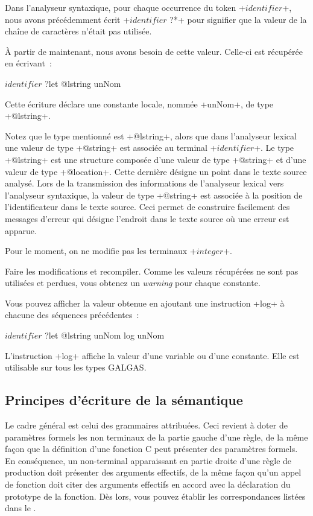 Dans l’analyseur syntaxique, pour chaque occurrence du token \ggst+$identifier$+, nous avons précédemment écrit \ggst+$identifier$ ?*+ pour signifier que la valeur de la chaîne de caractères n’était pas utilisée.

À partir de maintenant, nous avons besoin de cette valeur. Celle-ci est récupérée en écrivant~:

\begin{galgas3}
$identifier$ ?let @lstring unNom
\end{galgas3}


Cette écriture déclare une constante locale, nommée \ggst+unNom+, de type \ggst+@lstring+.

Notez que le type mentionné est \ggst+@lstring+, alors que dans l’analyseur lexical une valeur de type \ggst+@string+ est associée au terminal \ggst+$identifier$+. Le type \ggst+@lstring+ est une structure composée d’une valeur de type \ggst+@string+ et d’une valeur de type \ggst+@location+. Cette dernière désigne un point dans le texte source analysé. Lors de la transmission des informations de l’analyseur lexical vers l’analyseur syntaxique, la valeur de type \ggst+@string+ est associée à la position de l’identificateur dans le texte source. Ceci permet de construire facilement des messages d’erreur qui désigne l’endroit dans le texte source où une erreur est apparue.

Pour le moment, on ne modifie pas les terminaux \ggst+$integer$+.

Faire les modifications et recompiler. Comme les valeurs récupérées ne sont pas utilisées et perdues, vous obtenez un \emph{warning} pour chaque constante.

Vous pouvez afficher la valeur obtenue en ajoutant une instruction \ggst+log+ à chacune des séquences précédentes~:
\begin{galgas3}
$identifier$ ?let @lstring unNom
log unNom
\end{galgas3}

L'instruction \ggst+log+ affiche la valeur d'une variable ou d’une constante. Elle est utilisable sur tous les types GALGAS.

\subsection{Principes d'écriture de la sémantique}

Le cadre général est celui des grammaires attribuées. Ceci revient à doter de paramètres formels les non terminaux de la partie gauche d'une règle, de la même façon que la définition d'une fonction C peut présenter des paramètres formels. En conséquence, un non-terminal apparaissant en partie droite d'une règle de production doit présenter des arguments effectifs, de la même façon qu'un appel de fonction doit citer des arguments effectifs en accord avec la déclaration du prototype de la fonction. Dès lors, vous pouvez établir les correspondances listées dans le .

